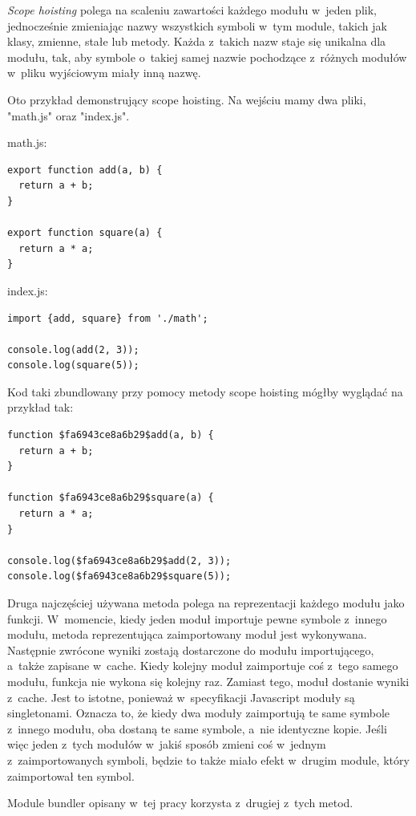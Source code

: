 \documentclass{SGGW-thesis}
\begin{document}
\emph{Scope hoisting} polega na scaleniu zawartości każdego modułu w~jeden plik, jednocześnie zmieniając nazwy wszystkich symboli w~tym module, takich jak klasy, zmienne, stałe lub metody. Każda z~takich nazw staje się unikalna dla modułu, tak, aby symbole o~takiej samej nazwie pochodzące z~różnych modułów w~pliku wyjściowym miały inną nazwę.

Oto przykład demonstrujący scope hoisting. Na wejściu mamy dwa pliki, "math.js" oraz "index.js".

math.js:
\begin{verbatim}
export function add(a, b) {
  return a + b;
}

export function square(a) {
  return a * a;
}
\end{verbatim}

index.js:
\begin{verbatim}
import {add, square} from './math';

console.log(add(2, 3));
console.log(square(5));
\end{verbatim}

Kod taki zbundlowany przy pomocy metody scope hoisting mógłby wyglądać na przykład tak:

\begin{verbatim}
function $fa6943ce8a6b29$add(a, b) {
  return a + b;
}

function $fa6943ce8a6b29$square(a) {
  return a * a;
}

console.log($fa6943ce8a6b29$add(2, 3));
console.log($fa6943ce8a6b29$square(5));
\end{verbatim}

Druga najczęściej używana metoda polega na reprezentacji każdego modułu jako funkcji. W~momencie, kiedy jeden moduł importuje pewne symbole z~innego modułu, metoda reprezentująca zaimportowany moduł jest wykonywana. Następnie zwrócone wyniki zostają dostarczone do modułu importującego, a~także zapisane w~cache. Kiedy kolejny moduł zaimportuje coś z~tego samego modułu, funkcja nie wykona się kolejny raz. Zamiast tego, moduł dostanie wyniki z~cache. Jest to istotne, ponieważ w~specyfikacji Javascript moduły są singletonami\cite{object_oriented_javascript}. Oznacza to, że kiedy dwa moduły zaimportują te same symbole z~innego modułu, oba dostaną te same symbole, a~nie identyczne kopie. Jeśli więc jeden z~tych modułów w~jakiś sposób zmieni coś w~jednym z~zaimportowanych symboli, będzie to także miało efekt w~drugim module, który zaimportował ten symbol.

Module bundler opisany w~tej pracy korzysta z~drugiej z~tych metod.
\end{document}
